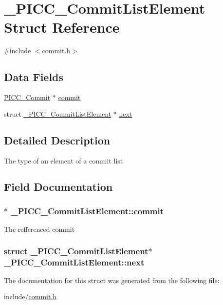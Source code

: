 \hypertarget{struct__PICC__CommitListElement}{\section{\-\_\-\-P\-I\-C\-C\-\_\-\-Commit\-List\-Element Struct Reference}
\label{struct__PICC__CommitListElement}
}


{\ttfamily \#include $<$commit.\-h$>$}

\subsection*{Data Fields}
{\bf }\par
\begin{DoxyCompactItemize}
\item 
\hyperlink{commit_8h_a655097bbaf0e81713b6d9336948c211c}{P\-I\-C\-C\-\_\-\-Commit} $\ast$ \hyperlink{struct__PICC__CommitListElement_aa8876c6c20d9b84d3e4c1767a11d8bcc}{commit}
\item 
struct \hyperlink{struct__PICC__CommitListElement}{\-\_\-\-P\-I\-C\-C\-\_\-\-Commit\-List\-Element} $\ast$ \hyperlink{struct__PICC__CommitListElement_a339f4cc910875dbb85401cbea95b7f5a}{next}
\end{DoxyCompactItemize}



\subsection{Detailed Description}
The type of an element of a commit list 

\subsection{Field Documentation}
\hypertarget{struct__PICC__CommitListElement_aa8876c6c20d9b84d3e4c1767a11d8bcc}{
\subsubsection[{commit}]{$\ast$ \-\_\-\-P\-I\-C\-C\-\_\-\-Commit\-List\-Element\-::commit}}\label{struct__PICC__CommitListElement_aa8876c6c20d9b84d3e4c1767a11d8bcc}
The refferenced commit \hypertarget{struct__PICC__CommitListElement_a339f4cc910875dbb85401cbea95b7f5a}{
\subsubsection[{next}]{\setlength{\rightskip}{0pt plus 5cm}struct {\bf \-\_\-\-P\-I\-C\-C\-\_\-\-Commit\-List\-Element}$\ast$ \-\_\-\-P\-I\-C\-C\-\_\-\-Commit\-List\-Element\-::next}}\label{struct__PICC__CommitListElement_a339f4cc910875dbb85401cbea95b7f5a}


The documentation for this struct was generated from the following file\-:\begin{DoxyCompactItemize}
\item 
include/\hyperlink{commit_8h}{commit.\-h}\end{DoxyCompactItemize}
